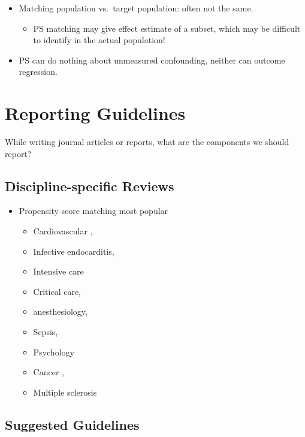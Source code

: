 \documentclass[
]{book}
\providecommand{\tightlist}{%
  \setlength{\itemsep}{0pt}\setlength{\parskip}{0pt}}
\begin{document}
\begin{itemize}
\tightlist
\item
  Matching population vs.~target population: often not the same.

  \begin{itemize}
  \tightlist
  \item
    PS matching may give effect estimate of a subset, which may be difficult to identify in the actual population!
  \end{itemize}
\item
  PS can do nothing about unmeasured confounding, neither can outcome regression.
\end{itemize}

\hypertarget{guide}{%
\chapter{Reporting Guidelines}\label{guide}}

While writing journal articles or reports, what are the components we should report?

\hypertarget{discipline-specific-reviews}{%
\section{Discipline-specific Reviews}\label{discipline-specific-reviews}}

\begin{itemize}
\tightlist
\item
  Propensity score matching most popular

  \begin{itemize}
  \tightlist
  \item
    Cardiovascular \citep{austin2007propensity},
  \item
    Infective endocarditis,
  \item
    Intensive care
  \item
    Critical care,
  \item
    anesthesiology,
  \item
    Sepsis,
  \item
    Psychology
  \item
    Cancer \citep{yao2017reporting},
  \item
    Multiple sclerosis \citep{karim2020use}
  \end{itemize}
\end{itemize}

\hypertarget{suggested-guidelines}{%
\section{Suggested Guidelines}\label{suggested-guidelines}}
\end{document}
